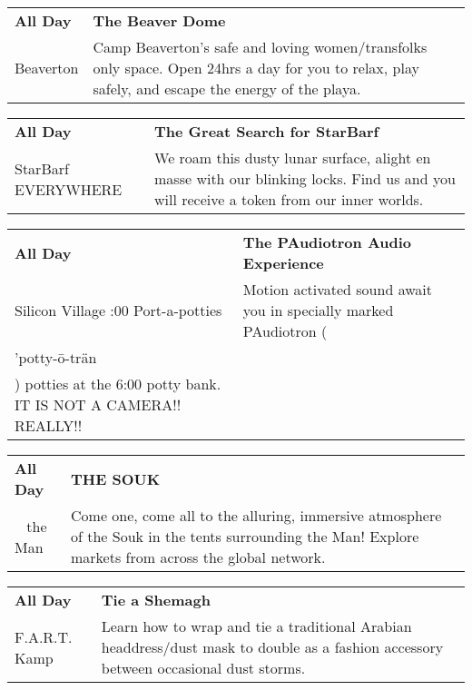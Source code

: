 \begin{tabular}{ p{1in} p{2.2in} }
    \textbf{All Day} & \textbf{The Beaver Dome} \\
    Beaverton \newline  & Camp Beaverton's safe and loving women/transfolks only space. Open 24hrs a day for you to relax, play safely, and escape the energy of the playa. \\
    \hline 
\end{tabular}
    
\begin{tabular}{ p{1in} p{2.2in} }
    \textbf{All Day} & \textbf{The Great Search for StarBarf} \\
    StarBarf \newline EVERYWHERE & We roam this dusty lunar surface, alight en masse with our blinking locks. Find us and you will receive a token from our inner worlds. \\
    \hline 
\end{tabular}
    
\begin{tabular}{ p{1in} p{2.2in} }
    \textbf{All Day} & \textbf{The PAudiotron Audio Experience} \\
    Silicon Village \newline 6:00 Port-a-potties & Motion activated sound await you in specially marked PAudiotron (\\'potty-\=o-tr\"an\\) potties at the 6:00 potty bank.  IT IS NOT A CAMERA!!  REALLY!! \\
    \hline 
\end{tabular}
    
\begin{tabular}{ p{1in} p{2.2in} }
    \textbf{All Day} & \textbf{THE SOUK} \\
    ~ \newline the Man & Come one, come all to the alluring, immersive atmosphere of the Souk in the tents surrounding the Man! Explore markets from across the global network. \\
    \hline 
\end{tabular}
    
\begin{tabular}{ p{1in} p{2.2in} }
    \textbf{All Day} & \textbf{Tie a Shemagh} \\
    F.A.R.T. Kamp \newline  & Learn how to wrap and tie a traditional Arabian headdress/dust mask to double as a fashion accessory between occasional dust storms. \\
    \hline 
\end{tabular}
    
